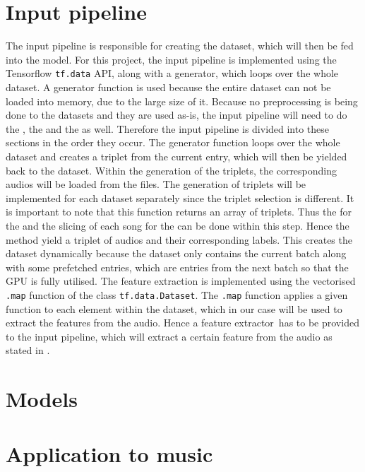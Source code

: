 \section{Input pipeline}
\label{sec:Input-Pipeline}
The input pipeline is responsible for creating the dataset, which will then be fed into the model. For this project, the input pipeline is implemented using the Tensorflow \texttt{tf.data} API\footnotemark, along with a generator, which loops over the whole dataset. A generator function is used because the entire dataset can not be loaded into memory, due to the large size of it.
\newline
\newline
Because no preprocessing is being done to the datasets and they are used as-is, the input pipeline will need to do the , the  and the  as well. Therefore the input pipeline is divided into these sections in the order they occur.
\newline
\newline
The generator function loops over the whole dataset and creates a triplet from the current entry, which will then be yielded back to the dataset. Within the generation of the triplets, the corresponding audios will be loaded from the files. The generation of triplets will be implemented for each dataset separately since the triplet selection is different. It is important to note that this function returns an array of triplets. Thus the  for the  and the slicing of each song for the  can be done within this step. Hence the method yield a triplet of audios and their corresponding labels.
\newline
\newline
This creates the dataset dynamically because the dataset only contains the current batch along with some prefetched entries, which are entries from the next batch so that the \gls{GPU} is fully utilised.
\newline
\newline
The feature extraction is implemented using the vectorised \texttt{.map} function of the class \texttt{tf.data.Dataset}\footnotemark. The \texttt{.map} function applies a given function to each element within the dataset, which in our case will be used to extract the features from the audio. Hence a \flqq feature extractor\frqq \ has to be provided to the input pipeline, which will extract a certain feature from the audio as stated in .

\section{Models}
\label{sec:Models}

\section{Application to music}
\label{sec:Application-Music}
